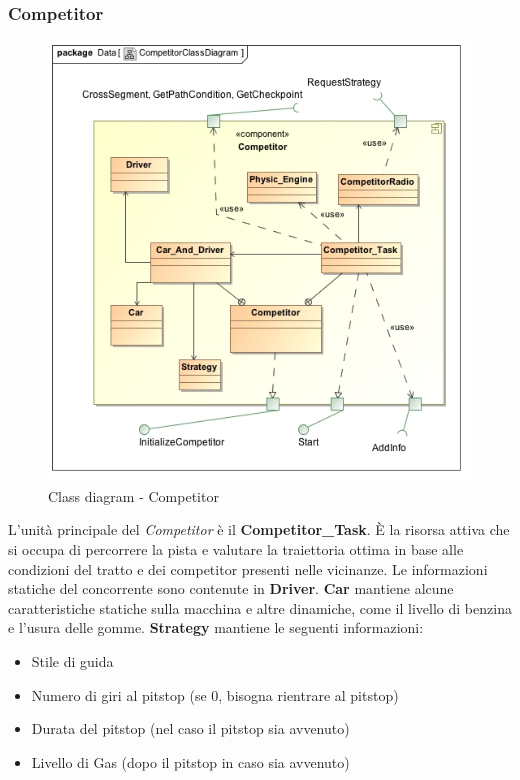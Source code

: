 \subsubsection{Competitor}
\begin{center}
\begin{figure}[h!]
	\includegraphics[scale=0.50]{img/ClassDiagrams/CompetitorClassDiagram.jpg}
\caption{Class diagram - Competitor}
\end{figure}
\end{center}
L'unit\`{a} principale del \emph{Competitor} \`{e} il \textbf{Competitor\_Task}. \`{E} la risorsa attiva che si occupa di percorrere la pista e valutare
la traiettoria ottima in base alle condizioni del tratto e dei competitor presenti nelle vicinanze. Le informazioni statiche del concorrente
sono contenute in \textbf{Driver}. \textbf{Car} mantiene alcune caratteristiche statiche sulla macchina e altre dinamiche, come il livello
di benzina e l'usura delle gomme. \textbf{Strategy} mantiene le seguenti informazioni:
\begin{itemize}
\item Stile di guida
\item Numero di giri al pitstop (se 0, bisogna rientrare al pitstop)
\item Durata del pitstop (nel caso il pitstop sia avvenuto)
\item Livello di Gas (dopo il pitstop in caso sia avvenuto)
\end{itemize}
